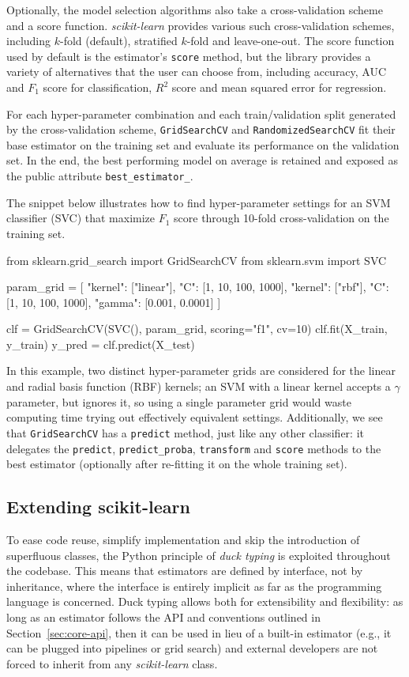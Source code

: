 \documentclass{llncs}
\newcommand{\sklearn}{\textit{scikit-learn}\xspace}
\begin{document}
Optionally, the model selection algorithms
also take a cross-validation scheme and a score function.  \sklearn provides
various such cross-validation schemes, including $k$-fold (default),
stratified $k$-fold and leave-one-out.
The score function used by default is the estimator's \texttt{score} method,
but the library provides a variety of
alternatives that the user can choose from,
including accuracy, AUC and $F_1$ score for classification,
$R^2$ score and mean squared error for regression.

For each hyper-parameter combination and each train/validation split
generated by the cross-validation scheme, \texttt{GridSearchCV}
and \texttt{RandomizedSearchCV} fit their base estimator on the training set and
evaluate its performance on the validation set.  In the end, the best performing
model on average is retained and exposed as the public attribute
\texttt{best\_estimator\_}.

The snippet below illustrates how to find
hyper-parameter settings for an SVM classifier (SVC)
that maximize $F_1$ score
through 10-fold cross-validation on the training set.
\begin{pythoncode}
from sklearn.grid_search import GridSearchCV
from sklearn.svm import SVC

param_grid = [
  {"kernel": ["linear"], "C": [1, 10, 100, 1000]},
  {"kernel": ["rbf"], "C": [1, 10, 100, 1000],
   "gamma": [0.001, 0.0001]}
]

clf = GridSearchCV(SVC(), param_grid, scoring="f1", cv=10)
clf.fit(X_train, y_train)
y_pred = clf.predict(X_test)
\end{pythoncode}
In this example, two distinct hyper-parameter grids are
considered for the linear and radial basis function (RBF) kernels;
an SVM with a linear kernel accepts a $\gamma$ parameter, but ignores it,
so using a single parameter grid would waste computing time
trying out effectively equivalent settings.
Additionally, we see that
\texttt{GridSearchCV} has a \texttt{predict} method, just like any other classifier:
it delegates the \texttt{predict}, \texttt{predict\_proba}, \texttt{transform} and
\texttt{score} methods to the best estimator
(optionally after re-fitting it on the whole training set).

\subsection{Extending scikit-learn}

To ease code reuse, simplify implementation and skip the introduction of
superfluous classes, the Python principle of \textit{duck typing} is exploited
throughout the codebase. This means that estimators are defined by interface,
not by inheritance, where the interface is entirely implicit
as far as the programming language is concerned.
Duck typing allows both for extensibility and
flexibility: as long as an estimator follows the API and conventions
outlined in Section~\ref{sec:core-api}, then it can be used in lieu of a
built-in estimator (e.g., it can be plugged into pipelines or grid search)
and external developers are not forced to inherit from any \sklearn class.
\end{document}
